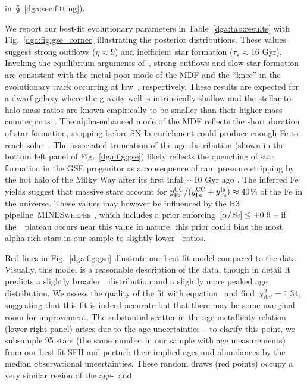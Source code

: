 in~\S~\ref{dga:sec:fitting}).
\par
We report our best-fit evolutionary parameters in Table~\ref{dga:tab:results}
with Fig.~\ref{dga:fig:gse_corner} illustrating the posterior distributions.
These values suggest strong outflows ($\eta \approx 9$) and inefficient star
formation ($\tau_\star \approx 16$ Gyr).
Invoking the equilibrium arguments of~\citet{Weinberg2017b}, strong outflows and
slow star formation are consistent with the metal-poor mode of the MDF and the
``knee'' in the evolutionary track occurring at low~\feh, respectively.
These results are expected for a dwarf galaxy where the gravity well is
intrinsically shallow and the stellar-to-halo mass ratios are known empirically
to be smaller than their higher mass counterparts~\citep{Hudson2015}.
The alpha-enhanced mode of the MDF reflects the short duration of star
formation, stopping before SN Ia enrichment could produce enough Fe to reach
solar~\afe.
The associated truncation of the age distribution (shown in the bottom left
panel of Fig.~\ref{dga:fig:gse}) likely reflects the quenching of star
formation in the GSE progenitor as a consequence of ram pressure stripping by
the hot halo of the Milky Way after its first infal~$\sim$10 Gyr ago
\citep{Bonaca2020}.
The inferred Fe yields suggest that massive stars account for
$y_\text{Fe}^\text{CC} / (y_\text{Fe}^\text{CC} + y_\text{Fe}^\text{Ia}) \approx 40$\% of the Fe in the universe.
These values may however be influenced by the H3 pipeline~\textsc{MINESweeper}
\citep{Cargile2020}, which includes a prior enforcing~$\text{[$\alpha$/Fe]} \leq +0.6$ -- if
the~\afe~plateau occurs near this value in nature, this prior could bias the
most alpha-rich stars in our sample to slightly lower~\afe~ratios.
\par
Red lines in Fig.~\ref{dga:fig:gse} illustrate our best-fit model compared to the
data
Visually, this model is a reasonable description of the data, though in detail
it predicts a slightly broader~\feh~distribution and a slightly more peaked age
distribution.
We assess the quality of the fit with equation~ and
find~$\chi_\text{dof}^2 = 1.34$, suggesting that this fit is indeed accurate
but that there may be some marginal room for improvement.
The substantial scatter in the age-metallicity relation (lower right panel)
arises due to the age uncertainties -- to clarify this point, we subsample 95
stars (the same number in our sample with age measurements) from our best-fit
SFH and perturb their implied ages and abundances by the median observational
uncertainties.
These random draws (red points) occupy a very similar region of the age-\feh~and
